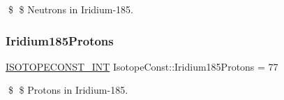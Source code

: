 \$ \$ Neutrons in Iridium-\/185. \mbox{\label{group___isotope_const-_iridium-_ir185_ga0a0a262ef07bf7117a38c11d5444ecd9}} 
\subsubsection{\texorpdfstring{Iridium185\+Protons}{Iridium185Protons}}
{\footnotesize\ttfamily \mbox{\hyperlink{group___isotope_const-_macros_ga5f18360b3e99483a35c32d789e62621c}{I\+S\+O\+T\+O\+P\+E\+C\+O\+N\+S\+T\+\_\+\+I\+NT}} Isotope\+Const\+::\+Iridium185\+Protons = 77}

\$ \$ Protons in Iridium-\/185. 